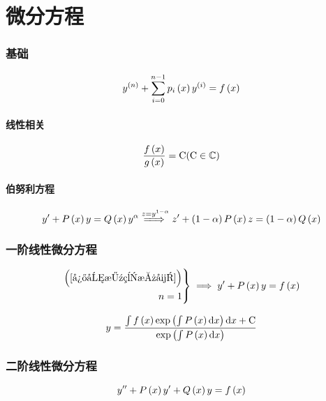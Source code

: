 \documentclass{article}
\begin{document}
\part{微分方程}

\section{基础}

\begin{definition}[$n$阶线性微分方程]
    \[y^{\left(n\right)}+\sum_{i=0}^{n-1}p_i\left(x\right)y^{\left(i\right)}=f\left(x\right)\label{微分方程总式}\]
\end{definition}

\subsection{线性相关}

\[\frac{f\left(x\right)}{g\left(x\right)}=\mathrm C(\mathrm C\in\mathbb C)\]

\subsection{伯努利方程}
\[y^\prime+P\left(x\right)y=Q\left(x\right)y^\alpha\overset{z=y^{1-\alpha}}{=\!\!\!\implies} z^\prime+\left(1-\alpha\right)P\left(x\right)z=\left(1-\alpha\right)Q\left(x\right)\]
\section{一阶线性微分方程}

\begin{definition}
    \[\left.\begin{aligned}
            \left(\ref{微分方程总式}\right) \\
            n=1
        \end{aligned}\right\}
        \implies
        y^\prime+P\left(x\right)y=f\left(x\right)\]
\end{definition}

\begin{theorem}[通解]
    \[y=\frac{\int{f\left(x\right)\exp\left(\int P\left(x\right)\mathrm dx\right)\mathrm dx}+\mathrm C}{\exp\left(\int P\left(x\right)\mathrm d x\right)}\]
\end{theorem}

\section{二阶线性微分方程}

\begin{definition}[]
    \[y^{\prime\prime}+P\left(x\right)y^\prime+Q\left(x\right)y=f\left(x\right)\]
\end{definition}
\end{document}
